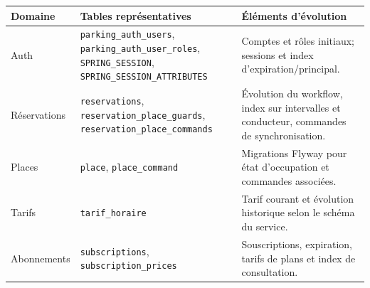 \documentclass[11pt,a4paper]{report}
\begin{document}
\begin{longtable}{p{2.9cm}p{4.5cm}p{5.8cm}}
\toprule
\textbf{Domaine} & \textbf{Tables représentatives} & \textbf{Éléments d'évolution} \\
\midrule
Auth & \texttt{parking\_auth\_users}, \texttt{parking\_auth\_user\_roles}, \texttt{SPRING\_SESSION}, \texttt{SPRING\_SESSION\_ATTRIBUTES} & Comptes et rôles initiaux; sessions et index d'expiration/principal. \\
Réservations & \texttt{reservations}, \texttt{reservation\_place\_guards}, \texttt{reservation\_place\_commands} & Évolution du workflow, index sur intervalles et conducteur, commandes de synchronisation. \\
Places & \texttt{place}, \texttt{place\_command} & Migrations Flyway pour état d'occupation et commandes associées. \\
Tarifs & \texttt{tarif\_horaire} & Tarif courant et évolution historique selon le schéma du service. \\
Abonnements & \texttt{subscriptions}, \texttt{subscription\_prices} & Souscriptions, expiration, tarifs de plans et index de consultation. \\
\bottomrule
\end{longtable}
\end{document}
